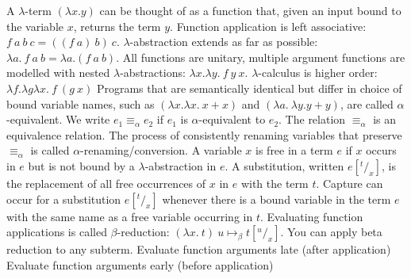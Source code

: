  A $\lambda$-term $(\lambda x. y)$ can be thought of as a function that, given an input bound to the variable $x$, returns the term $y$.
 Function application is left associative: $f\ a\ b\ c = ((f\ a)\ b)\ c$. $\lambda$-abstraction extends as far as possible: $\lambda a.\ f\ a\ b = \lambda a. (f\ a\ b)$. All functions are unitary, multiple argument functions are modelled with nested $\lambda$-abstractions: $\lambda x.\lambda y.\ f\ y\ x$. $\lambda$-calculus is higher order: $\lambda f.\lambda g\lambda x.\ f\ (g\ x)$
 Programs that are semantically identical but differ in choice of bound variable names, such as $(\lambda x. \lambda x.\ x+x)$ and $(\lambda a.\ \lambda y. y+y)$, are called $\alpha$-equivalent. We write $e_1 \equiv_{\alpha} e_2$ if $e_1$ is $\alpha$-equivalent to $e_2$. The relation $\equiv_{\alpha}$ is an equivalence relation.
 The process of consistently renaming variables that preserve $\equiv_\alpha$ is called $\alpha$-renaming/conversion.
 A variable $x$ is free in a term $e$ if $x$ occurs in $e$ but is not bound by a $\lambda$-abstraction in $e$.
 A substitution, written $e[^t/_x]$, is the replacement of all free  occurrences of $x$ in $e$ with the term $t$.
 Capture can occur for a substitution $e[^t/_x]$ whenever there is a bound variable in the term $e$ with the same name as a free variable occurring in $t$.
 Evaluating function applications is called $\beta$-reduction: $(\lambda x.\ t)\ u \mapsto_{\beta} t[^u/_x]$.
 You can apply beta reduction to any subterm.
 Evaluate function arguments late (after application)
 Evaluate function arguments early (before application)
